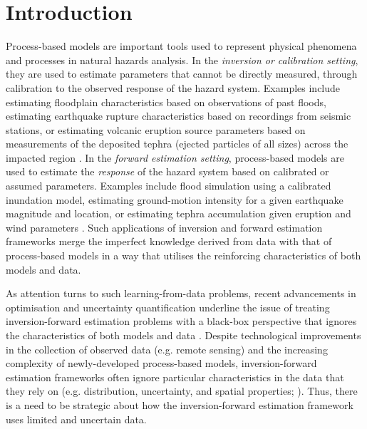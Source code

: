 \documentclass[a4paper,fleqn]{cas-sc}
\begin{document}

\section{Introduction}\label{section-intro}

Process-based models are important tools used to represent physical phenomena and processes in natural hazards analysis. In the \textit{inversion or calibration setting}, they are used to estimate parameters that cannot be directly measured, through calibration to the observed response of the hazard system. Examples include estimating floodplain characteristics based on observations of past floods, estimating earthquake rupture characteristics based on recordings from seismic stations, or estimating volcanic eruption source parameters based on measurements of the deposited tephra (ejected particles of all sizes) across the impacted region \citep{li2022comparative, georgoudas2007cellular, connor2006inversion}. In the \textit{forward estimation setting}, process-based models are used to estimate the \textit{response} of the hazard system based on calibrated or assumed parameters. Examples include flood simulation using a calibrated inundation model, estimating ground-motion intensity for a given earthquake magnitude and location, or estimating tephra accumulation given eruption and wind parameters \citep{uhlenbrook2004hydrological, worden2010revised, wang2022ground, hurst1999performance, folch2009fall3d}. Such applications of inversion and forward estimation frameworks merge the imperfect knowledge derived from data with that of process-based models in a way that utilises the reinforcing characteristics of both models and data.

As attention turns to such learning-from-data problems, recent advancements in optimisation and uncertainty quantification underline the issue of treating inversion-forward estimation problems with a black-box perspective that ignores the characteristics of both models and data \citep{hollos2022conditional, cabaneros2022methods, biegler2011large, ISAAC2015348, oden2010computer}. Despite technological improvements in the collection of observed data (e.g. remote sensing) and the increasing complexity of newly-developed process-based models, inversion-forward estimation frameworks often ignore particular characteristics in the data that they rely on (e.g. distribution, uncertainty, and spatial properties; \cite{willcox2021imperative}). Thus, there is a need to be strategic about how the inversion-forward estimation framework uses limited and uncertain data.
\end{document}
